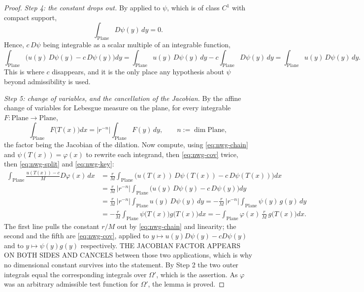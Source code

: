 \begin{proof}
\medskip\noindent\emph{Step 4: the constant drops out.}
By  applied to $\psi$, which is of class $C^{1}$ with
compact support,
\[
  \int_{\mathrm{Plane}}D\psi(y)\,dy=0 .
\]
Hence, $c\,D\psi$ being integrable as a scalar multiple of an integrable function,
\begin{equation}\label{eq:nwg-split}
  \int_{\mathrm{Plane}}\bigl(u(y)\,D\psi(y)-c\,D\psi(y)\bigr)dy
  =\int_{\mathrm{Plane}}u(y)\,D\psi(y)\,dy-c\int_{\mathrm{Plane}}D\psi(y)\,dy
  =\int_{\mathrm{Plane}}u(y)\,D\psi(y)\,dy .
\end{equation}
This is where $c$ disappears, and it is the only place any hypothesis about $\psi$ beyond
admissibility is used.

\medskip\noindent\emph{Step 5: change of variables, and the cancellation of the Jacobian.}
By the affine change of variables for Lebesgue measure on the plane, for every integrable
$F\colon\mathrm{Plane}\to\mathrm{Plane}$,
\begin{equation}\label{eq:nwg-cov}
  \int_{\mathrm{Plane}}F\bigl(T(x)\bigr)dx
  =\bigl\lvert r^{-n}\bigr\rvert\int_{\mathrm{Plane}}F(y)\,dy ,
  \qquad n:=\dim\mathrm{Plane},
\end{equation}
the factor being the Jacobian of the dilation.  Now compute, using \eqref{eq:nwg-chain} and
$\psi(T(x))=\varphi(x)$ to rewrite each integrand, then \eqref{eq:nwg-cov} twice, then
\eqref{eq:nwg-split} and \eqref{eq:nwg-key}:
\[
\begin{aligned}
  \int_{\mathrm{Plane}}\frac{u(T(x))-c}{M}D\varphi(x)\,dx
  &=\frac{r}{M}\int_{\mathrm{Plane}}
      \bigl(u(T(x))\,D\psi(T(x))-c\,D\psi(T(x))\bigr)dx\\
  &=\frac{r}{M}\,\bigl\lvert r^{-n}\bigr\rvert
      \int_{\mathrm{Plane}}\bigl(u(y)\,D\psi(y)-c\,D\psi(y)\bigr)dy\\
  &=\frac{r}{M}\,\bigl\lvert r^{-n}\bigr\rvert
      \int_{\mathrm{Plane}}u(y)\,D\psi(y)\,dy
   =-\frac{r}{M}\,\bigl\lvert r^{-n}\bigr\rvert
      \int_{\mathrm{Plane}}\psi(y)\,g(y)\,dy\\
  &=-\frac{r}{M}\int_{\mathrm{Plane}}\psi\bigl(T(x)\bigr)g\bigl(T(x)\bigr)dx
   =-\int_{\mathrm{Plane}}\varphi(x)\,\frac{r}{M}\,g\bigl(T(x)\bigr)dx .
\end{aligned}
\]
The first line pulls the constant $r/M$ out by \eqref{eq:nwg-chain} and linearity; the second and
the fifth are \eqref{eq:nwg-cov}, applied to $y\mapsto u(y)D\psi(y)-cD\psi(y)$ and to
$y\mapsto\psi(y)g(y)$ respectively.  THE JACOBIAN FACTOR APPEARS ON BOTH SIDES AND CANCELS
between those two applications, which is why no dimensional constant survives into the statement.
By Step 2 the two outer integrals equal the corresponding integrals over $\Omega'$, which is the
assertion.  As $\varphi$ was an arbitrary admissible test function for $\Omega'$, the lemma is
proved.
\end{proof}
